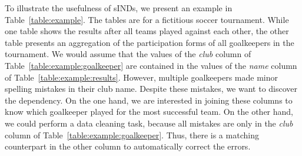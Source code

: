 To illustrate the usefulness of sINDs, we present an example in Table~\ref{table:example}.
The tables are for a fictitious soccer tournament.
While one table shows the results after all teams played against each other, the other table presents an aggregation of the participation forms of all goalkeepers in the tournament.
We would assume that the values of the \emph{club} column of Table~\ref{table:example:goalkeeper} are contained in the values of the \emph{name} column of Table~\ref{table:example:results}.
However, multiple goalkeepers made minor spelling mistakes in their club name.
Despite these mistakes, we want to discover the dependency.
On the one hand, we are interested in joining these columns to know which goalkeeper played for the most successful team.
On the other hand, we could perform a data cleaning task, because all mistakes are only in the \emph{club} column of Table~\ref{table:example:goalkeeper}.
Thus, there is a matching counterpart in the other column to automatically correct the errors.

